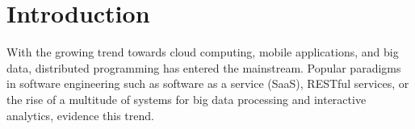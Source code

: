 \documentclass[runningheads]{llncs}
\begin{document}
\begin{sloppypar}
\begin{abstract}

\end{abstract}
%
\section{Introduction}



With the growing trend towards cloud computing, mobile applications, and big data,
distributed programming has entered the mainstream. Popular paradigms in software
engineering such as software as a service (SaaS), RESTful services, or the rise
of a multitude of systems for big data processing and interactive
analytics, evidence this trend.


\end{sloppypar}
\end{document}
